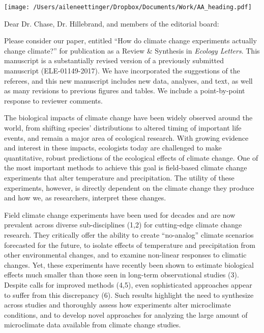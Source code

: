\documentclass[11pt,a4paper]{letter}
\begin{document}


\begin{letter}{}
\texttt{[image: /Users/aileneettinger/Dropbox/Documents/Work/AA\_heading.pdf]}

\opening{Dear Dr. Chase, Dr. Hillebrand, and members of the editorial board:}
Please consider our paper, entitled ``How do climate change experiments actually change climate?'' for publication as a Review \& Synthesis in \emph{Ecology Letters}. This manuscript is a substantially revised version of a previously submitted manuscript  (ELE-01149-2017). We have incorporated the suggestions of the referees, and this new manuscript includes new data, analyses, and text, as well as many revisions to previous figures and tables. We include a point-by-point response to reviewer comments.

The biological impacts of climate change have been widely observed around the world, from shifting species' distributions to altered timing of important life events, and remain a major area of ecological research. With growing evidence and interest in these impacts, ecologists today are challenged to make quantitative, robust predictions of the ecological effects of climate change. One of the most important methods to achieve this goal is field-based climate change experiments that alter temperature and precipitation. The utility of these experiments, however, is directly dependent on the climate change they produce and how we, as researchers, interpret these changes. 

Field climate change experiments have been used for decades and are now prevalent across diverse sub-disciplines  (1,2) %
for cutting-edge climate change research. They critically offer the ability to create ``no-analog'' climate scenarios forecasted for the future, to isolate effects of temperature and precipitation from other environmental changes, and to examine non-linear responses to climatic changes. Yet, these experiments have recently been shown to estimate biological effects much smaller than those seen in long-term observational studies (3). %
Despite calls for improved methods (4,5), %
even sophisticated approaches appear to suffer from this discrepancy (6). %
Such results highlight the need to synthesize across studies and thoroughly assess how experiments alter microclimate conditions, and to develop novel approaches for analyzing the large amount of microclimate data available from climate change studies. 


\end{letter}
\end{document}
